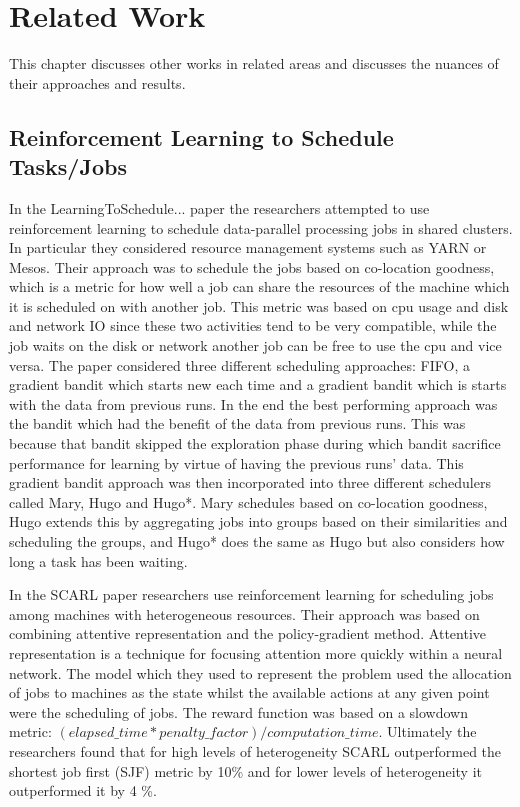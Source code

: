 
\cleardoublepage
\chapter{Related Work}
\label{cha:related_work}

This chapter discusses other works in related areas and discusses the nuances of their approaches and results. 

\section{Reinforcement Learning to Schedule Tasks/Jobs}
\label{sec:rl_scheduling}

In the LearningToSchedule... paper the researchers attempted to use reinforcement learning to schedule data-parallel processing jobs in shared clusters. In particular they considered resource management systems such as YARN or Mesos. Their approach was to schedule the jobs based on co-location goodness, which is a metric for how well a job can share the resources of the machine which it is scheduled on with another job. This metric was based on cpu usage and disk and network IO since these two activities tend to be very compatible, while the job waits on the disk or network another job can be free to use the cpu and vice versa. The paper considered three different scheduling approaches: FIFO, a gradient bandit which starts new each time and a gradient bandit which is starts with the data from previous runs. In the end the best performing approach was the bandit which had the benefit of the data from previous runs. This was because that bandit skipped the exploration phase during which bandit sacrifice performance for learning by virtue of having the previous runs' data. This gradient bandit approach was then incorporated into three different schedulers called Mary, Hugo and Hugo*.  Mary schedules based on co-location goodness, Hugo extends this by aggregating jobs into groups based on their similarities and scheduling the groups, and Hugo* does the same as Hugo but also considers how long a task has been waiting. 

In  the SCARL paper researchers use reinforcement learning for scheduling jobs among machines with heterogeneous resources. Their approach was based on combining attentive representation and the policy-gradient method. Attentive representation is a technique for focusing attention more quickly within a neural network. The model which they used to represent the problem used the allocation of jobs to machines as the state whilst the available actions at any given point were the scheduling of jobs. The reward function was based on a slowdown metric: $(elapsed\_time * penalty\_ factor) / computation\_time$. Ultimately the researchers found that for high levels of heterogeneity SCARL outperformed the shortest job first (SJF) metric by 10\% and for lower levels of heterogeneity it outperformed it by 4 \%.

